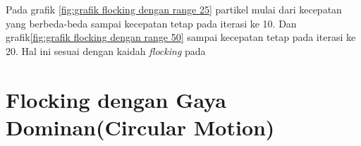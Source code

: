 \hspace{0.6cm} Pada grafik \ref{fig:grafik flocking dengan range 25} partikel mulai dari kecepatan yang berbeda-beda sampai kecepatan tetap pada iterasi ke 10. Dan grafik\ref{fig:grafik flocking dengan range 50} sampai kecepatan tetap pada iterasi ke 20. Hal ini sesuai dengan kaidah \textit{flocking} pada \citep{Bajec2007} 

\section{Flocking dengan Gaya Dominan(Circular Motion)}%


